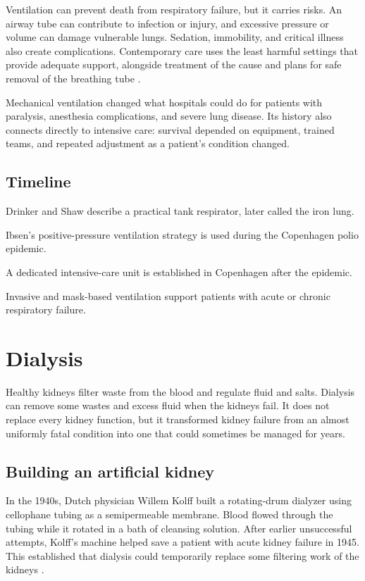 \documentclass[12pt,oneside]{book}
\begin{document}
Ventilation can prevent death from respiratory failure, but it carries
risks. An airway tube can contribute to infection or injury, and excessive
pressure or volume can damage vulnerable lungs. Sedation, immobility, and
critical illness also create complications. Contemporary care uses the
least harmful settings that provide adequate support, alongside treatment
of the cause and plans for safe removal of the breathing tube
\cite{homeVentilationHistory}.

Mechanical ventilation changed what hospitals could do for patients with
paralysis, anesthesia complications, and severe lung disease. Its history
also connects directly to intensive care: survival depended on equipment,
trained teams, and repeated adjustment as a patient's condition changed.

\section*{Timeline}
\begin{description}[leftmargin=2.3cm,style=nextline]
  \item[1928] Drinker and Shaw describe a practical tank respirator, later called the iron lung.
  \item[1952] Ibsen's positive-pressure ventilation strategy is used during the Copenhagen polio epidemic.
  \item[1953] A dedicated intensive-care unit is established in Copenhagen after the epidemic.
  \item[Today] Invasive and mask-based ventilation support patients with acute or chronic respiratory failure.
\end{description}
\chapter[Dialysis]{Dialysis}

Healthy kidneys filter waste from the blood and regulate fluid and salts.
Dialysis can remove some wastes and excess fluid when the kidneys fail. It
does not replace every kidney function, but it transformed kidney failure
from an almost uniformly fatal condition into one that could sometimes be
managed for years.

\section{Building an artificial kidney}
In the 1940s, Dutch physician Willem Kolff built a rotating-drum dialyzer
using cellophane tubing as a semipermeable membrane. Blood flowed through
the tubing while it rotated in a bath of cleansing solution. After earlier
unsuccessful attempts, Kolff's machine helped save a patient with acute
kidney failure in 1945. This established that dialysis could temporarily
replace some filtering work of the kidneys
\cite{locDialysisHistory,nwkidneyDialysisMuseum}.
\end{document}

